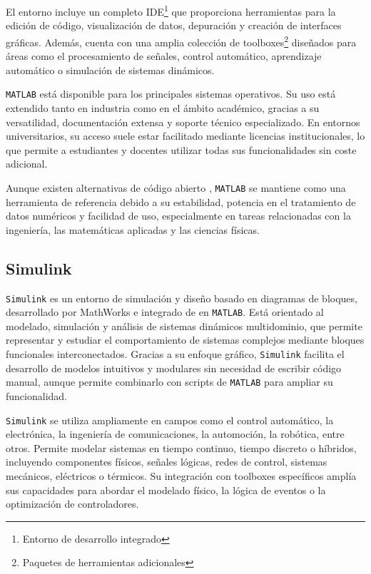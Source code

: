 El entorno incluye un completo IDE\footnote{Entorno de desarrollo integrado} que proporciona herramientas para la edición de código, visualización de datos, depuración y creación de interfaces gráficas. Además, cuenta con una amplia colección de toolboxes\footnote{Paquetes de herramientas adicionales} diseñados para áreas como el procesamiento de señales, control automático, aprendizaje automático o simulación de sistemas dinámicos.

\texttt{MATLAB} está disponible para los principales sistemas operativos. Su uso está extendido tanto en industria como en el ámbito académico, gracias a su versatilidad, documentación extensa y soporte técnico especializado. En entornos universitarios, su acceso suele estar facilitado mediante licencias institucionales, lo que permite a estudiantes y docentes utilizar todas sus funcionalidades sin coste adicional.

Aunque existen alternativas de código abierto , \texttt{MATLAB} se mantiene como una herramienta de referencia debido a su estabilidad, potencia en el tratamiento de datos numéricos y facilidad de uso, especialmente en tareas relacionadas con la ingeniería, las matemáticas aplicadas y las ciencias físicas.

\subsection{Simulink}
\texttt{Simulink} \cite{mathworks_simulink} es un entorno de simulación y diseño basado en diagramas de bloques, desarrollado por MathWorks e integrado de en \texttt{MATLAB}. Está orientado al modelado, simulación y análisis de sistemas dinámicos multidominio, que permite representar y estudiar el comportamiento de sistemas complejos mediante bloques funcionales interconectados. Gracias a su enfoque gráfico, \texttt{Simulink} facilita el desarrollo de modelos intuitivos y modulares sin necesidad de escribir código manual, aunque permite combinarlo con scripts de \texttt{MATLAB} para ampliar su funcionalidad.

\texttt{Simulink} se utiliza ampliamente en campos como el control automático, la electrónica, la ingeniería de comunicaciones, la automoción, la robótica, entre otros. Permite modelar sistemas en tiempo continuo, tiempo discreto o híbridos, incluyendo componentes físicos, señales lógicas, redes de control, sistemas mecánicos, eléctricos o térmicos. Su integración con toolboxes específicos amplía sus capacidades para abordar el modelado físico, la lógica de eventos o la optimización de controladores.

